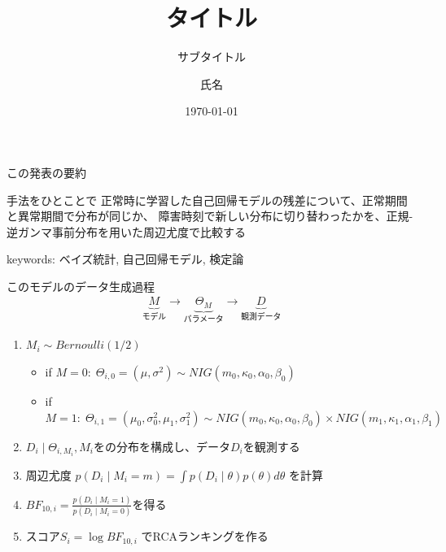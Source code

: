\documentclass[dvipdfmx, 11pt, aspectratio=169, notheorems]{beamer}
\title[タイトル]{タイトル}
\subtitle{サブタイトル}
\author[氏名]{氏名}
\institute[早稲田大学]{早稲田大学 基幹理工学研究科 数学応用数理専攻\\清水研究室}
\date{\today}
\begin{document}
\begin{frame}
    \titlepage
\end{frame}

\begin{frame}{この発表の要約}
    \begin{block}{手法をひとことで}
        正常時に学習した自己回帰モデルの残差について、正常期間と異常期間で分布が同じか、
        障害時刻で新しい分布に切り替わったかを、正規-逆ガンマ事前分布を用いた周辺尤度で比較する
    \end{block}
    keywords: ベイズ統計, 自己回帰モデル, 検定論
\end{frame}

\begin{frame}
    \begin{block}{このモデルのデータ生成過程}
        \begin{align}
            \underbrace{M}_{\text{モデル}} \rightarrow \underbrace{\Theta_M}_{\text{パラメータ}} \rightarrow \underbrace{D}_{\text{観測データ}} 
        \end{align}
    \end{block}
    \begin{enumerate}
        \item $M_i \sim Bernoulli(1/2)$
        \begin{itemize}
            \item if \; $M=0:\; \Theta_{i,0}=(\mu, \sigma^2)\sim NIG(m_0, \kappa_0, \alpha_0, \beta_0)$
            \item if \; $M=1:\; \Theta_{i,1}=(\mu_0, \sigma_0^2, \mu_1, \sigma_1^2)\sim NIG(m_0, \kappa_0, \alpha_0, \beta_0) \times NIG(m_1, \kappa_1, \alpha_1, \beta_1)$
        \end{itemize}
        \item $D_i\mid \Theta_{i,M_i}, M_i$をの分布を構成し、データ$D_i$を観測する
        \item 周辺尤度 $p(D_i \mid M_i = m) = \int p(D_i \mid \theta) p(\theta) d\theta$ を計算
        \item $BF_{10,i} = \frac{p(D_i \mid M_i = 1)}{p(D_i \mid M_i = 0)}$を得る
        \item スコア$S_i=\log{BF_{10,i}}$ でRCAランキングを作る
    \end{enumerate}
\end{frame}
\end{document}
